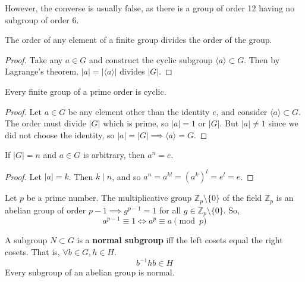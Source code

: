   However, the converse is usually false, as there is a group of order 12 having no subgroup of order 6. 

  \begin{corollary}
    The order of any element of a finite group divides the order of the group. 
  \end{corollary}
  \begin{proof}
    Take any $a \in G$ and construct the cyclic subgroup $\langle a \rangle \subset G$. Then by Lagrange's theorem, $|a| = |\langle a \rangle|$ divides $|G|$. 
  \end{proof}

  \begin{corollary}
    Every finite group of a prime order is cyclic. 
  \end{corollary}
  \begin{proof}
    Let $a \in G$ be any element other than the identity $e$, and consider $\langle a \rangle \subset G$. The order must divide $|G|$ which is prime, so $|a| = 1$ or $|G|$. But $|a| \neq 1$ since we did not choose the identity, so $|a| = |G| \implies \langle a \rangle = G$. 
  \end{proof}

  \begin{corollary}
    If $|G| = n$ and $a \in G$ is arbitrary, then $a^n = e$. 
  \end{corollary}
  \begin{proof}
    Let $|a| = k$. Then $k \mid n$, and so $a^n = a^{kl} = (a^k)^l = e^l = e$. 
  \end{proof}

  \begin{corollary}
    Let $p$ be a prime number. The multiplicative group $\mathbb{Z}_{p} \setminus \{0\}$ of the field $\mathbb{Z}_{p}$ is an abelian group of order $p-1 \implies g^{p-1} = 1$ for all $g \in \mathbb{Z}_{p} \setminus \{0\}$. So,
    \begin{equation}
      a^{p-1} \equiv 1 \iff a^{p} \equiv a \pmod{p}
    \end{equation}
  \end{corollary} 

  \begin{definition}
    A subgroup $N \subset G$ is a \textbf{normal subgroup} iff the left cosets equal the right cosets. That is, $\forall b \in G, h \in H$. 
    \begin{equation}
      b^{-1} h b \in H
    \end{equation}
    Every subgroup of an abelian group is normal. 
  \end{definition} 

